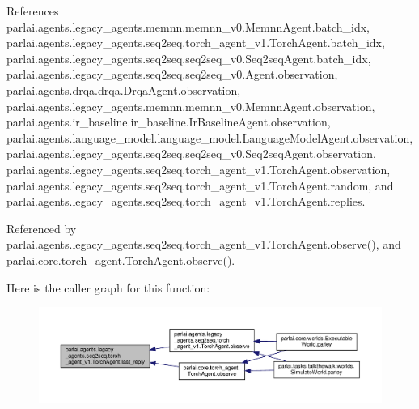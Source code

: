 References parlai.\+agents.\+legacy\+\_\+agents.\+memnn.\+memnn\+\_\+v0.\+Memnn\+Agent.\+batch\+\_\+idx, parlai.\+agents.\+legacy\+\_\+agents.\+seq2seq.\+torch\+\_\+agent\+\_\+v1.\+Torch\+Agent.\+batch\+\_\+idx, parlai.\+agents.\+legacy\+\_\+agents.\+seq2seq.\+seq2seq\+\_\+v0.\+Seq2seq\+Agent.\+batch\+\_\+idx, parlai.\+agents.\+legacy\+\_\+agents.\+seq2seq.\+seq2seq\+\_\+v0.\+Agent.\+observation, parlai.\+agents.\+drqa.\+drqa.\+Drqa\+Agent.\+observation, parlai.\+agents.\+legacy\+\_\+agents.\+memnn.\+memnn\+\_\+v0.\+Memnn\+Agent.\+observation, parlai.\+agents.\+ir\+\_\+baseline.\+ir\+\_\+baseline.\+Ir\+Baseline\+Agent.\+observation, parlai.\+agents.\+language\+\_\+model.\+language\+\_\+model.\+Language\+Model\+Agent.\+observation, parlai.\+agents.\+legacy\+\_\+agents.\+seq2seq.\+seq2seq\+\_\+v0.\+Seq2seq\+Agent.\+observation, parlai.\+agents.\+legacy\+\_\+agents.\+seq2seq.\+torch\+\_\+agent\+\_\+v1.\+Torch\+Agent.\+observation, parlai.\+agents.\+legacy\+\_\+agents.\+seq2seq.\+torch\+\_\+agent\+\_\+v1.\+Torch\+Agent.\+random, and parlai.\+agents.\+legacy\+\_\+agents.\+seq2seq.\+torch\+\_\+agent\+\_\+v1.\+Torch\+Agent.\+replies.



Referenced by parlai.\+agents.\+legacy\+\_\+agents.\+seq2seq.\+torch\+\_\+agent\+\_\+v1.\+Torch\+Agent.\+observe(), and parlai.\+core.\+torch\+\_\+agent.\+Torch\+Agent.\+observe().

Here is the caller graph for this function\+:
\nopagebreak
\begin{figure}[H]
\begin{center}
\leavevmode
\includegraphics[width=350pt]{classparlai_1_1agents_1_1legacy__agents_1_1seq2seq_1_1torch__agent__v1_1_1TorchAgent_abf7a50ea0eb319737123d2e46fde4c0f_icgraph}
\end{center}
\end{figure}
\mbox{\label{classparlai_1_1agents_1_1legacy__agents_1_1seq2seq_1_1torch__agent__v1_1_1TorchAgent_a6d71ad7997e048e4f4f7d957fae64ac5}} 
